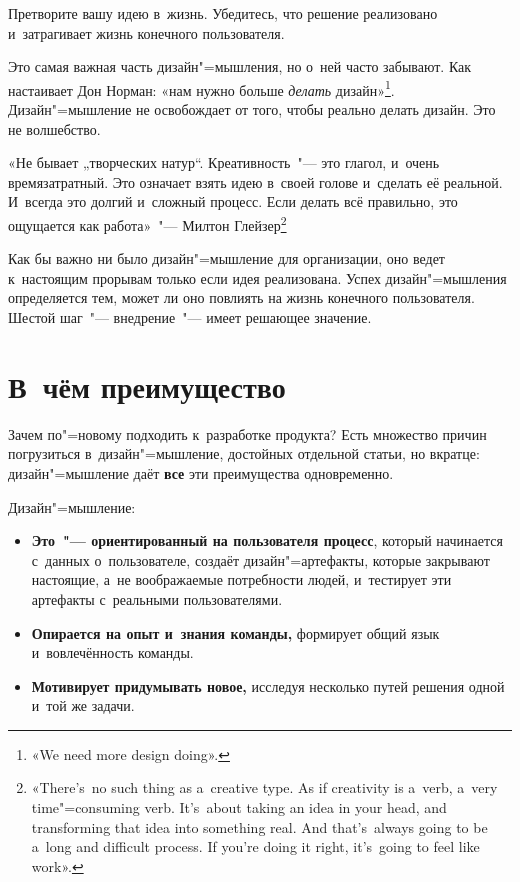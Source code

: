 \documentclass[12pt]{article}
\begin{document}
Претворите вашу идею в~жизнь. Убедитесь, что решение реализовано и~затрагивает жизнь конечного пользователя.

Это самая важная часть дизайн"=мышления, но о~ней часто забывают. Как настаивает Дон Норман: «нам нужно больше \textit{делать} дизайн»\footnote{«We need more design doing».}. Дизайн"=мышление не освобождает от того, чтобы реально делать дизайн. Это не волшебство. 
\par
\begin{leftbar}
	«Не бывает „творческих натур“. Креативность~"--- это глагол, и~очень времязатратный. Это означает взять идею в~своей голове и~сделать её реальной. И~всегда это долгий и~сложный процесс. Если делать всё правильно, это ощущается как работа»~"--- Милтон Глейзер\footnote{«There’s~no such thing as a~creative type. As if creativity is a~verb, a~very time"=consuming verb. It’s~about taking an idea in your head, and transforming that idea into something real. And that’s~always going to be a~long and difficult process. If you’re doing it right, it’s~going to feel like work».}
\end{leftbar}

Как бы важно ни было дизайн"=мышление для организации, оно ведет к~настоящим прорывам только если идея реализована. Успех дизайн"=мышления определяется тем, может ли оно повлиять на жизнь конечного пользователя. Шестой шаг~"--- внедрение~"--- имеет решающее значение.  

\section{В~чём преимущество}

Зачем по"=новому подходить к~разработке продукта? Есть множество причин погрузиться в~дизайн"=мышление, достойных отдельной статьи, но вкратце: дизайн"=мышление даёт \textbf{все} эти преимущества одновременно.

Дизайн"=мышление:
\begin{itemize}
	\item\textbf{Это~"--- ориентированный на пользователя процесс}, который начинается с~данных о~пользователе, создаёт дизайн"=артефакты, которые закрывают настоящие, а~не воображаемые потребности людей, и~тестирует эти артефакты с~реальными пользователями.
	\item\textbf{Опирается на опыт и~знания команды,} формирует общий язык и~вовлечённость команды.
	\item\textbf{Мотивирует придумывать новое,} исследуя несколько путей решения одной и~той же задачи.
\end{itemize}
\end{document}
